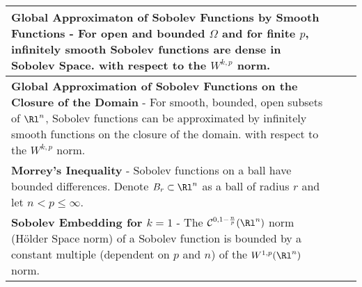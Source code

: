 \begin{longtable}{|*{3}{>{\centering\arraybackslash}p{}|}}
            \\[6pt] \hline
            
            \textbf{Global Approximaton of Sobolev Functions by Smooth Functions} - For open and bounded $\Omega$ and for finite $p$, infinitely smooth Sobolev functions are dense in Sobolev Space. \newline {$\!\begin{gathered} \mathcal{C}^\infty(\Omega) \cap W^{k,p}(\Omega) \qquad \text{is dense in} \qquad W^{k,p}(\Omega) \end{gathered}$} \newline with respect to the $W^{k,p}$ norm.
            &
            
            \\[6pt] \hline
            
            \textbf{Global Approximation of Sobolev Functions on the Closure of the Domain} - For smooth, bounded, open subsets of $\Rl^n$, Sobolev functions can be approximated by infinitely smooth functions on the closure of the domain. \newline {$\!\begin{gathered} \mathcal{C}^\infty(\overline{\Omega}) \qquad \text{is dense in} \qquad W^{k,p}(\Omega) \end{gathered}$} \newline with respect to the $W^{k,p}$ norm.
            &
            
            \\[6pt] \hline
            
            \textbf{Morrey's Inequality} - Sobolev functions on a ball have bounded differences.  Denote $B_r \subset \Rl^n$ as a ball of radius $r$ and let $n < p \leq \infty$. \newline {$\!\begin{gathered} \abs{u(x) - u(y)} \leq C \abs{x - y}^{1 - \frac{n}{p}}\norm{D u}_{L^p(B_r)} \end{gathered}$}
            &
            
            \\[6pt] \hline
            
            \textbf{Sobolev Embedding for $k = 1$} - The $\mathcal{C}^{0,1 - \frac{n}{p}}(\Rl^n)$ norm (H\"{o}lder Space norm) of a Sobolev function is bounded by a constant multiple (dependent on $p$ and $n$) of the $W^{1,p}(\Rl^n)$ norm. \newline {$\!\begin{gathered} \norm{u}_{\mathcal{C}^{0, 1 - \frac{n}{p}}(\Rl^n)} \leq C\norm{u}_{W^{1,p}(\Rl^n)} \end{gathered}$}
            &
            

\end{longtable}
